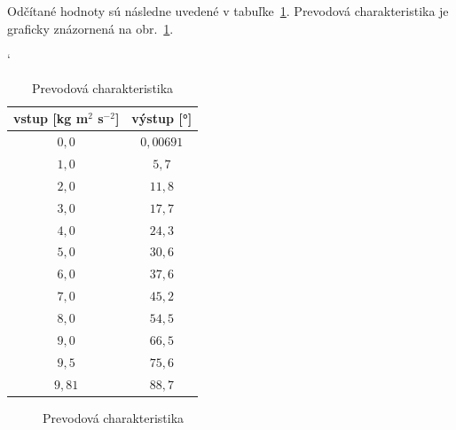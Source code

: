 \documentclass[a4paper, 10pt, ]{article}
\begin{document}
Odčítané hodnoty sú následne uvedené v tabuľke~\ref{Prevodová charakteristika}. Prevodová charakteristika je graficky znázornená na obr.~\ref{Prevodová charakteristika graf}.





\begin{table}[!ht]
	\centering
	\catcode`

\caption{Prevodová charakteristika}
\label{Prevodová charakteristika}


\vspace{-2mm}


\begin{tabular}{     c      c       }
\toprule
vstup [kg m$^2$ s$^{-2}$] & výstup [°] \\
\midrule
$0,0$ & $0,00691$\\
$1,0$ & $5,7$\\
$2,0$ & $11,8$\\
$3,0$ & $17,7$\\
$4,0$ & $24,3$\\
$5,0$ & $30,6$\\
$6,0$ & $37,6$\\
$7,0$ & $45,2$\\
$8,0$ & $54,5$\\
$9,0$ & $66,5$\\
$9,5$ & $75,6$\\
$9,81$ & $88,7$\\
\bottomrule
\end{tabular}
\end{table}



\begin{figure}[!ht]
	\centering


    \vspace{-6mm}

	\caption{Prevodová charakteristika}
	\label{Prevodová charakteristika graf}

\end{figure}
\end{document}
